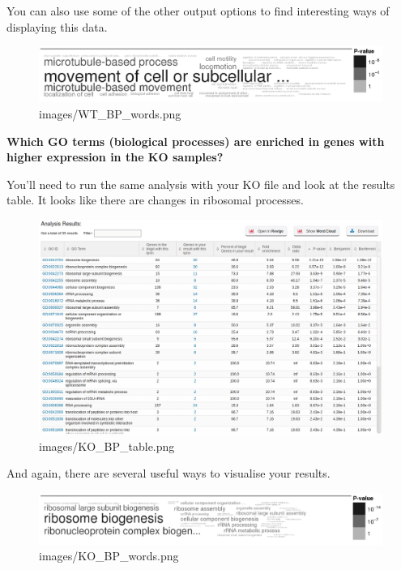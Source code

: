 \documentclass[11pt]{article}
\makeatletter
\def\maxwidth{\ifdim\Gin@nat@width>\linewidth\linewidth
    \else\Gin@nat@width\fi}
\let\Oldincludegraphics\includegraphics
\renewcommand{\includegraphics}[1]{\Oldincludegraphics[width=.8\maxwidth, height=.55\textheight, keepaspectratio]{#1}}
\makeatother
\begin{document}
\newpage

    You can also use some of the other output options to find interesting
ways of displaying this data.

    \begin{figure}[!h]
\centering
\includegraphics{images/WT_BP_words.png}
\caption{images/WT\_BP\_words.png}
\end{figure}

    \textbf{Which GO terms (biological processes) are enriched in genes with
higher expression in the KO samples?}

    You'll need to run the same analysis with your KO file and look at the
results table. It looks like there are changes in ribosomal processes.

    \begin{figure}[!h]
\centering
\includegraphics{images/KO_BP_table.png}
\caption{images/KO\_BP\_table.png}
\end{figure}

    And again, there are several useful ways to visualise your results.

    \begin{figure}[!h]
\centering
\includegraphics{images/KO_BP_words.png}
\caption{images/KO\_BP\_words.png}
\end{figure}
\end{document}
